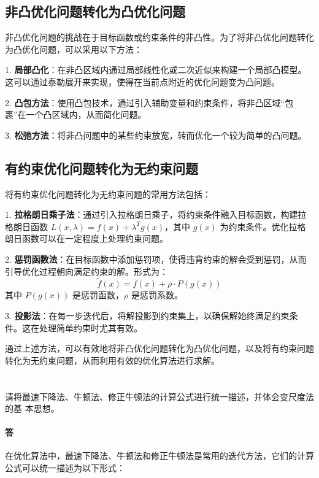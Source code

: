 \documentclass[a4paper]{article}
\begin{document}
\subsection{非凸优化问题转化为凸优化问题}

非凸优化问题的挑战在于目标函数或约束条件的非凸性。为了将非凸优化问题转化为凸优化问题，可以采用以下方法：

1. \textbf{局部凸化}：在非凸区域内通过局部线性化或二次近似来构建一个局部凸模型。这可以通过泰勒展开来实现，使得在当前点附近的优化问题变为凸问题。

2. \textbf{凸包方法}：使用凸包技术，通过引入辅助变量和约束条件，将非凸区域“包裹”在一个凸区域内，从而简化问题。

3. \textbf{松弛方法}：将非凸问题中的某些约束放宽，转而优化一个较为简单的凸问题。

\subsection{有约束优化问题转化为无约束问题}

将有约束优化问题转化为无约束问题的常用方法包括：

1. \textbf{拉格朗日乘子法}：通过引入拉格朗日乘子，将约束条件融入目标函数，构建拉格朗日函数 $L(x, \lambda) = f(x) + \lambda^T g(x)$，其中 $g(x)$ 为约束条件。优化拉格朗日函数可以在一定程度上处理约束问题。

2. \textbf{惩罚函数法}：在目标函数中添加惩罚项，使得违背约束的解会受到惩罚，从而引导优化过程朝向满足约束的解。形式为：
   \[
   \tilde{f}(x) = f(x) + \rho \cdot P(g(x))
   \]
   其中 $P(g(x))$ 是惩罚函数，$\rho$ 是惩罚系数。

3. \textbf{投影法}：在每一步迭代后，将解投影到约束集上，以确保解始终满足约束条件。这在处理简单约束时尤其有效。

通过上述方法，可以有效地将非凸优化问题转化为凸优化问题，以及将有约束问题转化为无约束问题，从而利用有效的优化算法进行求解。

\section{}

请将最速下降法、牛顿法、修正牛顿法的计算公式进行统一描述，并体会变尺度法的基
本思想。 

\paragraph{答}

在优化算法中，最速下降法、牛顿法和修正牛顿法是常用的迭代方法，它们的计算公式可以统一描述为以下形式：
\end{document}
